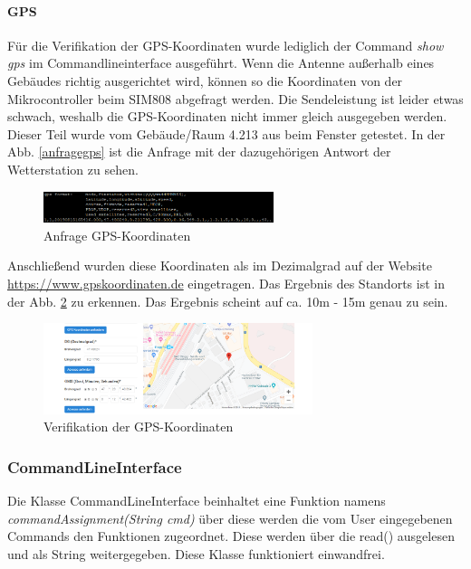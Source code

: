 \paragraph{GPS}
\label{para:validgps}
Für die Verifikation der GPS-Koordinaten wurde lediglich der Command \textit{show gps} im Commandlineinterface ausgeführt. Wenn die Antenne außerhalb eines Gebäudes richtig ausgerichtet wird, können so die Koordinaten von der Mikrocontroller beim SIM808 abgefragt werden. Die Sendeleistung ist leider etwas schwach, weshalb die GPS-Koordinaten nicht immer gleich ausgegeben werden. Dieser Teil wurde vom Gebäude/Raum 4.213 aus beim Fenster getestet. In der Abb. \ref{anfragegps} ist die Anfrage mit der dazugehörigen Antwort der Wetterstation zu sehen.\\
\begin{figure}[h]
\centering
\includegraphics[width=0.6\textwidth]{../../graphics/FW_val/gps_signal.PNG}
\caption{Anfrage GPS-Koordinaten}
\label{fig:anfragegps}
\end{figure}
 Anschließend wurden diese Koordinaten als im Dezimalgrad auf der Website \url{https://www.gpskoordinaten.de} eingetragen. Das Ergebnis des Standorts ist in der Abb. \ref{fig:validgps} zu erkennen. Das Ergebnis scheint auf ca. 10m - 15m genau zu sein.\\
\begin{figure}[h]
\centering
\includegraphics[width=0.7\textwidth]{../../graphics/FW_val/plot_gpsdaten.PNG}
\caption{Verifikation der GPS-Koordinaten}
\label{fig:validgps}
\end{figure}

\subsubsection{CommandLineInterface}
\label{subsubsec:valCommandLineInterface}
Die Klasse CommandLineInterface beinhaltet eine Funktion namens \textit{commandAssignment(String cmd)} über diese werden die vom User eingegebenen Commands den Funktionen zugeordnet. Diese werden über die read() ausgelesen und als String weitergegeben. Diese Klasse funktioniert einwandfrei.\\


